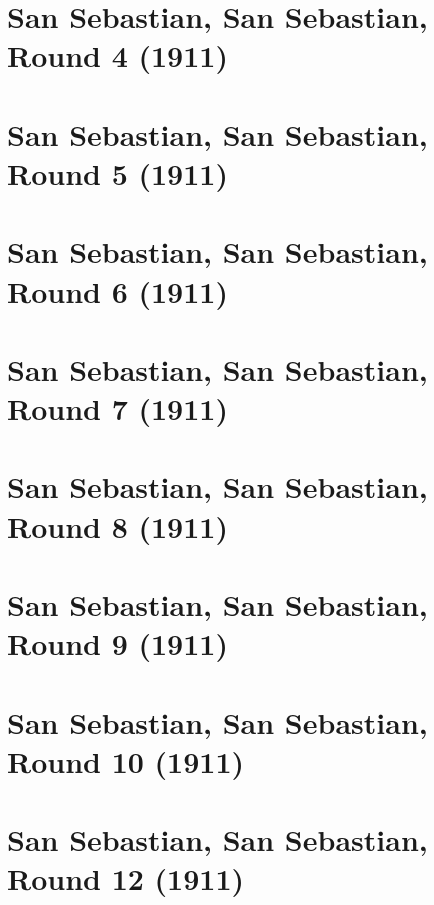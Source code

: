 \documentclass[11pt]{article}
\begin{document}
\clearpage

\section{San Sebastian, San Sebastian, Round 4 (1911)}


\clearpage

\section{San Sebastian, San Sebastian, Round 5 (1911)}


\clearpage

\section{San Sebastian, San Sebastian, Round 6 (1911)}


\clearpage

\section{San Sebastian, San Sebastian, Round 7 (1911)}


\clearpage

\section{San Sebastian, San Sebastian, Round 8 (1911)}


\clearpage

\section{San Sebastian, San Sebastian, Round 9 (1911)}


\clearpage

\section{San Sebastian, San Sebastian, Round 10 (1911)}


\clearpage

\section{San Sebastian, San Sebastian, Round 12 (1911)}

\end{document}
